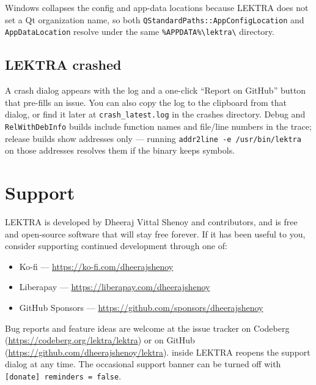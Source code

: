 \documentclass[a4paper,12pt]{article}
\begin{document}
Windows collapses the config and app-data locations because LEKTRA does not set a Qt organization name, so both \texttt{QStandardPaths::AppConfigLocation} and \texttt{AppDataLocation} resolve under the same \texttt{\%APPDATA\%\textbackslash lektra\textbackslash} directory.

\subsection{LEKTRA crashed}
A crash dialog appears with the log and a one-click ``Report on GitHub'' button that pre-fills an issue. You can also copy the log to the clipboard from that dialog, or find it later at \texttt{crash\_\allowbreak{}latest.log} in the crashes directory. Debug and \texttt{RelWithDebInfo} builds include function names and file/line numbers in the trace; release builds show addresses only — running \texttt{addr2line -e /usr/bin/lektra} on those addresses resolves them if the binary keeps symbols.

\section{Support}

LEKTRA is developed by Dheeraj Vittal Shenoy and contributors, and is free and open-source software that will stay free forever. If it has been useful to you, consider supporting continued development through one of:

\begin{itemize}[leftmargin=*]
    \item Ko-fi — \url{https://ko-fi.com/dheerajshenoy}
    \item Liberapay — \url{https://liberapay.com/dheerajshenoy}
    \item GitHub Sponsors — \url{https://github.com/sponsors/dheerajshenoy}
\end{itemize}

Bug reports and feature ideas are welcome at the issue tracker on Codeberg (\url{https://codeberg.org/lektra/lektra}) or on GitHub (\url{https://github.com/dheerajshenoy/lektra}).  inside LEKTRA reopens the support dialog at any time. The occasional support banner can be turned off with \texttt{[donate] reminders = false}.
\end{document}
